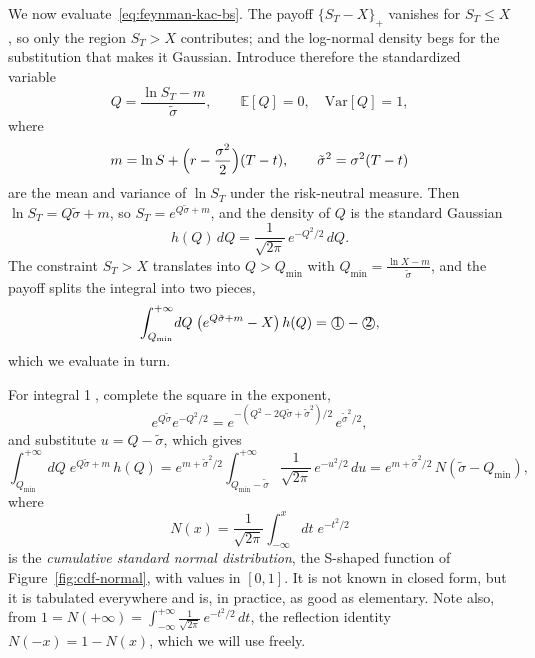 We now evaluate~\eqref{eq:feynman-kac-bs}.
The payoff $\{S_T-X\}_+$ vanishes for $S_T\le X$, so only the region $S_T>X$ contributes; and the log-normal density begs for the substitution that makes it Gaussian.
Introduce therefore the standardized variable
\begin{equation}
Q = \frac{\ln S_T - m}{\tilde\sigma}, \qquad
\mathbb{E}[Q]=0, \quad \mathrm{Var}[Q]=1,
\end{equation}
where
\begin{equation}
m = \ln S + \Bigl(r - \frac{\sigma^2}{2}\Bigr)(T-t), \qquad \tilde\sigma^2 = \sigma^2(T-t)
\end{equation}
are the mean and variance of $\ln S_T$ under the risk-neutral measure.
Then $\ln S_T = Q\tilde\sigma + m$, so $S_T = e^{Q\tilde\sigma + m}$, and the density of $Q$ is the standard Gaussian
\begin{equation}
h(Q)\, dQ = \frac{1}{\sqrt{2\pi}}\, e^{-Q^2/2}\, dQ.
\end{equation}
The constraint $S_T > X$ translates into $Q > Q_{\min}$ with $Q_{\min} = \frac{\ln X - m}{\tilde\sigma}$, and the payoff splits the integral into two pieces,
\begin{equation}
\int_{Q_{\min}}^{+\infty}\!dQ\;\bigl(e^{Q\tilde\sigma+m} - X\bigr)\,h(Q) = \text{\textcircled{1}} - \text{\textcircled{2}},
\end{equation}
which we evaluate in turn.

For integral \textcircled{1}, complete the square in the exponent,
\begin{equation}
e^{Q\tilde\sigma}e^{-Q^2/2} = e^{-(Q^2 - 2Q\tilde\sigma + \tilde\sigma^2)/2}\, e^{\tilde\sigma^2/2},
\end{equation}
and substitute $u = Q-\tilde\sigma$, which gives
\begin{equation}
\int_{Q_{\min}}^{+\infty}\!dQ\; e^{Q\tilde\sigma + m}\, h(Q)
= e^{m+\tilde\sigma^2/2}\int_{Q_{\min}-\tilde\sigma}^{+\infty}\!\frac{1}{\sqrt{2\pi}}\,e^{-u^2/2}\, du = e^{m+\tilde\sigma^2/2}\, N(\tilde\sigma - Q_{\min}),
\end{equation}
where
\begin{equation}
N(x) = \frac{1}{\sqrt{2\pi}}\int_{-\infty}^{x}\!dt\; e^{-t^2/2}
\end{equation}
is the \emph{cumulative standard normal distribution}, the S-shaped function of Figure~\ref{fig:cdf-normal}, with values in $[0,1]$.
It is not known in closed form, but it is tabulated everywhere and is, in practice, as good as elementary.
Note also, from $1 = N(+\infty) = \int_{-\infty}^{+\infty}\frac{1}{\sqrt{2\pi}}\,e^{-t^2/2}\,dt$, the reflection identity $N(-x) = 1 - N(x)$, which we will use freely.

